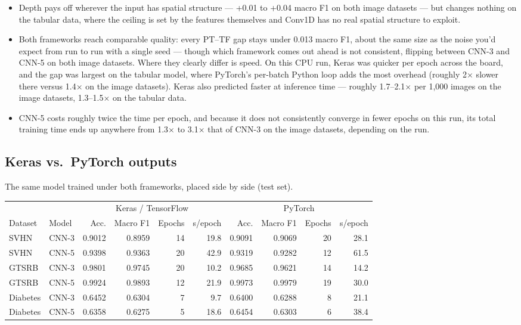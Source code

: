 \documentclass[11pt, a4paper]{article}
\begin{document}
\begin{itemize}
\item Depth pays off wherever the input has spatial structure — +0.01 to +0.04 macro F1 on both image datasets — but
  changes nothing on the tabular data, where the ceiling is set by the features themselves and Conv1D has no real
  spatial structure to exploit.
\item Both frameworks reach comparable quality: every PT--TF gap stays under 0.013 macro F1, about the same size as
  the noise you'd expect from run to run with a single seed — though which framework comes out ahead is not
  consistent, flipping between CNN-3 and CNN-5 on both image datasets. Where they clearly differ is speed. On this
  CPU run, Keras was quicker per epoch across the board, and the gap was largest on the tabular model, where
  PyTorch's per-batch Python loop adds the most overhead (roughly 2$\times$ slower there versus 1.4$\times$ on the
  image datasets). Keras also predicted faster at inference time — roughly 1.7--2.1$\times$ per 1,000 images on the
  image datasets, 1.3--1.5$\times$ on the tabular data.
\item CNN-5 costs roughly twice the time per epoch, and because it does not consistently converge in fewer epochs on
  this run, its total training time ends up anywhere from 1.3$\times$ to 3.1$\times$ that of CNN-3 on the image
  datasets, depending on the run.
\end{itemize}

\subsection{Keras vs.\ PyTorch outputs}
The same model trained under both frameworks, placed side by side (test set).

\begin{table}[H]
\centering
\small
\begin{tabular}{llrrrrrrrr}
\toprule
 & & \multicolumn{4}{c}{Keras / TensorFlow} & \multicolumn{4}{c}{PyTorch} \\
\cmidrule(lr){3-6}\cmidrule(lr){7-10}
Dataset & Model & Acc. & Macro F1 & Epochs & s/epoch & Acc. & Macro F1 & Epochs & s/epoch \\
\midrule
SVHN & CNN-3 & 0.9012 & 0.8959 & 14 & 19.8 & 0.9091 & 0.9069 & 20 & 28.1 \\
SVHN & CNN-5 & 0.9398 & 0.9363 & 20 & 42.9 & 0.9319 & 0.9282 & 12 & 61.5 \\
GTSRB & CNN-3 & 0.9801 & 0.9745 & 20 & 10.2 & 0.9685 & 0.9621 & 14 & 14.2 \\
GTSRB & CNN-5 & 0.9924 & 0.9893 & 12 & 21.9 & 0.9973 & 0.9979 & 19 & 30.0 \\
Diabetes & CNN-3 & 0.6452 & 0.6304 & 7 & 9.7 & 0.6400 & 0.6288 & 8 & 21.1 \\
Diabetes & CNN-5 & 0.6358 & 0.6275 & 5 & 18.6 & 0.6454 & 0.6303 & 6 & 38.4 \\
\bottomrule
\end{tabular}
\end{table}
\end{document}
